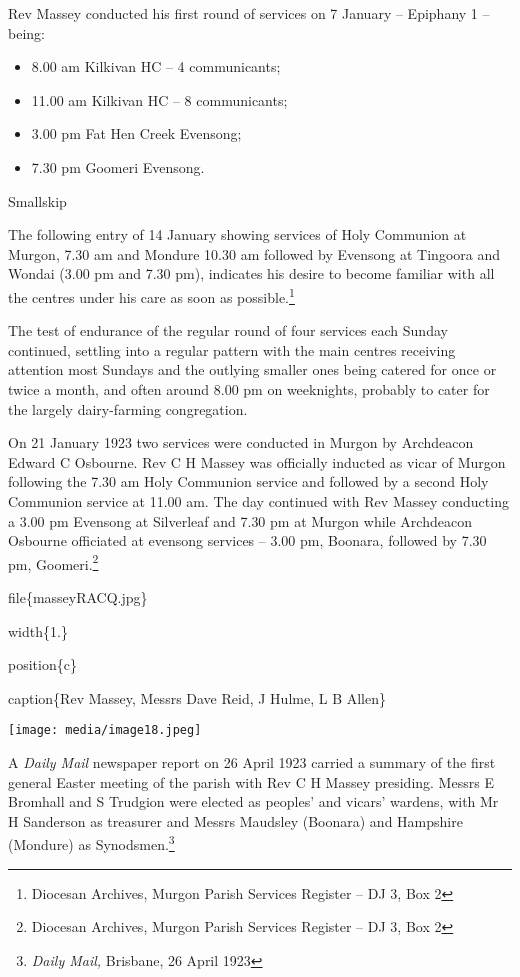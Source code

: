 Rev Massey conducted his first round of services on 7 January -- Epiphany 1 -- being:

\begin{itemize}
\item
  8.00 am Kilkivan HC -- 4 communicants;
\item
  11.00 am Kilkivan HC -- 8 communicants;
\item
  3.00 pm Fat Hen Creek Evensong;
\item
  7.30 pm Goomeri Evensong.
\end{itemize}

Smallskip

The following entry of 14 January showing services of Holy Communion at Murgon, 7.30 am and Mondure 10.30 am followed by Evensong at Tingoora and Wondai (3.00 pm and 7.30 pm), indicates his desire to become familiar with all the centres under his care as soon as possible.\footnote{Diocesan Archives, Murgon Parish Services Register -- DJ 3, Box 2}

The test of endurance of the regular round of four services each Sunday continued, settling into a regular pattern with the main centres receiving attention most Sundays and the outlying smaller ones being catered for once or twice a month, and often around 8.00 pm on weeknights, probably to cater for the largely dairy-farming congregation.

On 21 January 1923 two services were conducted in Murgon by Archdeacon Edward C Osbourne. Rev C H Massey was officially inducted as vicar of Murgon following the 7.30 am Holy Communion service and followed by a second Holy Communion service at 11.00 am. The day continued with Rev Massey conducting a 3.00 pm Evensong at Silverleaf and 7.30 pm at Murgon while Archdeacon Osbourne officiated at evensong services -- 3.00 pm, Boonara, followed by 7.30 pm, Goomeri.\footnote{Diocesan Archives, Murgon Parish Services Register -- DJ 3, Box 2}

file\{masseyRACQ.jpg\}

width\{1.\}

position\{c\}

caption\{Rev Massey, Messrs Dave Reid, J Hulme, L B Allen\}

\texttt{[image: media/image18.jpeg]}

A \emph{Daily Mail} newspaper report on 26 April 1923 carried a summary of the first general Easter meeting of the parish with Rev C H Massey presiding. Messrs E Bromhall and S Trudgion were elected as peoples' and vicars' wardens, with Mr H Sanderson as treasurer and Messrs Maudsley (Boonara) and Hampshire (Mondure) as Synodsmen.\footnote{\emph{Daily Mail,} Brisbane, 26 April 1923}

